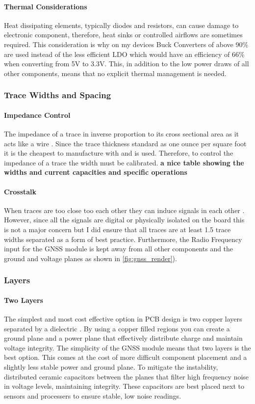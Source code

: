 \paragraph{Thermal Considerations}
Heat dissipating elements, typically diodes and resistors, can cause damage to electronic component, therefore, heat sinks or controlled airflows are sometimes required. This consideration is why on my devices Buck Converters of above 90\% are used instead of the less efficient \gls{LDO} which would have an efficiency of 66\% when converting from 5V to 3.3V. This, in addition to the low power draws of all other components, means that no explicit thermal management is needed.

\subsubsection{Trace Widths and Spacing}
\paragraph{Impedance Control}
The impedance of a trace in inverse proportion to its cross sectional area as it acts like a wire \cite{a source}. Since the trace thickness standard as one ounce per square foot \cite{source} it is the cheapest to manufacture with and is used. Therefore, to control the impedance of a trace the width must be calibrated. \textbf{a nice table showing the widths and current capacities and specific operations}
\paragraph{Crosstalk}
When traces are too close too each other they can induce signals in each other \cite{REF}. However, since all the signals are digital or physically isolated on the board this is not a major concern but I did ensure that all traces are at least 1.5 trace widths separated as a form of best practice. Furthermore, the Radio Frequency input for the \gls{GNSS} module is kept away from all other components and the ground and voltage planes as shown in \ref{fig:gnss_render}).

\subsubsection{Layers}
\paragraph{Two Layers}
The simplest and most cost effective option in \gls{PCB} design is two copper layers separated by a dielectric \cite{REF}. By using a copper filled regions you can create a ground plane and a power plane that effectively distribute charge and maintain voltage integrity. The simplicity of the \gls{GNSS} module means that two layers is the best option. This comes at the cost of more difficult component placement and a slightly less stable power and ground plane. To mitigate the instability, distributed ceramic capacitors between the planes that filter high frequency noise in voltage levels, maintaining integrity. These capacitors are best placed next to sensors and processers to ensure stable, low noise readings.

